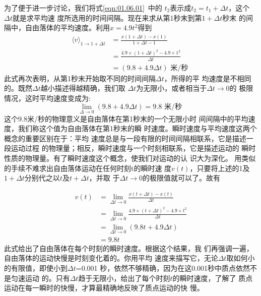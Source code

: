 为了便于进一步讨论，我们将式\ref{eqn:01.06.01}~中的
$t_2$表示成$t_2=t_1+\Delta t$，这个$\Delta t$就是求平均速
度所选用的时间间隔。现在来求从第1秒末到第$1+\Delta t$秒末
的间隔中，自由落体的平均速度。利用$x=4.9t^2$得到
\begin{equation*}
    \begin{aligned}
        \langle v\rangle_{1 \rightarrow 1+\Delta t} & =\frac{x(1+\Delta t)-x(1)}{1+\Delta t-1}                      \\
                                                    & =\frac{4.9 \times(1+\Delta t)^{2}-4.9 \times 1^{2}}{\Delta t} \\
                                                    & =(9.8+4.9 \Delta t) \text { 米/秒 }
    \end{aligned}
\end{equation*}
此式再次表明，从第1秒末开始取不同的时间间隔$\Delta t$，所得的平
均速度是不相同的。既然$\Delta t$越小描述得越精确，我们取
$\Delta t$为无限小，或者相当于$\Delta t \rightarrow 0$的
极限情况，这时平均速度变成为:
\begin{equation*}
    \lim _{\Delta \rightarrow 0}(9.8+4.9 \Delta t)=9.8 \text { 米/秒 }
\end{equation*}
这个9.8米/秒的物理意义是自由落体在第1秒末的一个无限小时
间间隔中的平均速度，我们称这个值为自由落体在第1秒末的瞬
时速度。瞬时速度与平均速度这两个概念的重要区别在于：平均
速度总是与一段有限的时间间隔相联系，它是描述一段运动过程
的物理量；相反，瞬时速度与一个时刻相联系，它是描述运动的
瞬时性质的物理量。有了瞬时速度这个概念，使我们对运动的认
识大为深化。
用类似的手续不难求出自由落体运动在任何时刻t的瞬时速
度$v(t)$，只要将上述的1及$1+\Delta t$分别代之以$t$及$t+\Delta t$，并取
于$\Delta t \rightarrow 0$的极限值就可以了。故有

\begin{equation}\label{eqn:01.06.02}
    \begin{aligned}
        v(t) & =\lim _{\Delta t \rightarrow 0} \frac{x(t+\Delta t)-x(t)}{\Delta t}                          \\
             & =\lim _{\Delta t \rightarrow 0} \frac{4.9 \times(t+\Delta t)^{2}-4.9 \times t^{2}}{\Delta t} \\
             & =\lim _{\Delta t \rightarrow 0}(9.8 t+4.9 \Delta t)                                          \\
             & =9.8 t
    \end{aligned}
\end{equation}
此式给出了自由落体在每个时刻的瞬时速度。根据这个结果，我
们再强调一遍，自由落体的运动快慢是时刻变化着的。你用平均
速度来描写它，无论$\Delta t$取如何小的有限值，即使小到$\Delta t$=0.001
秒，依然不够精确，因为在这0.001秒中质点依然不是匀速运动
的。只有$\Delta t$趋于无限小，给出了每个时刻$t$的瞬时速度，了解了
质点运动在每一瞬时的快慢，才算最精确地反映了质点运动的快
慢。

